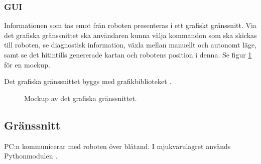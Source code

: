\documentclass[a4paper,11pt]{article}
\begin{document}
\subsubsection{GUI}
Informationen som tas emot från roboten presenteras i ett grafiskt gränssnitt. Via det grafiska gränssnittet ska användaren kunna välja kommandon som ska skickas till roboten, se diagnostisk information, växla mellan manuellt och autonomt läge, samt se det hitintills genererade kartan och robotens position i denna. Se figur \ref{fig:gui_mockup} för en mockup.

Det grafiska gränssnittet byggs med grafikbiblioteket \cite{tkinter}.

\begin{figure}[h!]
    \caption{Mockup av det grafiska gränssnittet.}
    \label{fig:gui_mockup}
\end{figure}

\subsection{Gränssnitt} \label{ssec:PCInterface}

PC:n kommunicerar med roboten över blåtand. I mjukvarulagret används Pythonmodulen \cite{pybluez}.
\end{document}
